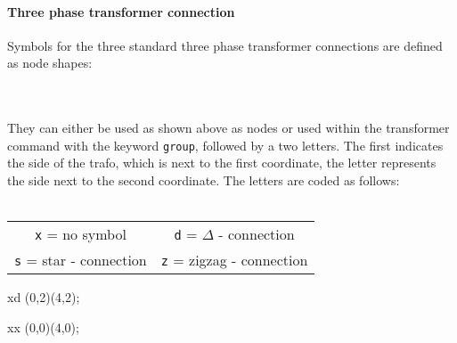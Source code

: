 \documentclass[a4]{article}
\begin{document}
\paragraph{Three phase transformer connection}
Symbols for the three standard three phase transformer connections are defined as node shapes:\\[3pt]
\\ \ \\
They can either be used as shown above as nodes or used within the transformer command with the keyword \verb+group+, followed by a two letters. The first indicates the side of the trafo, which is next to the first coordinate, the letter represents the side next to the  second coordinate. The letters are coded as follows: \\ \ \\[-3mm]
\begin{center}
\begin{tabular}{cc}
\texttt{x} = no symbol\hspace{0.75cm} &
\texttt{d} = $\Delta$ - connection\hspace{0.75cm} \\
\texttt{s} = star - connection\hspace{0.75cm} &
\texttt{z} = zigzag - connection \\
\end{tabular}
\end{center}
\begin{SaveVerbatim}{xd}
\trafo[group=xd](0,2)(4,2);
\end{SaveVerbatim}
\begin{SaveVerbatim}{xx}
\trafo[group=xx](0,0)(4,0);
\end{SaveVerbatim}
\vspace{0.5cm}%
\end{document}
